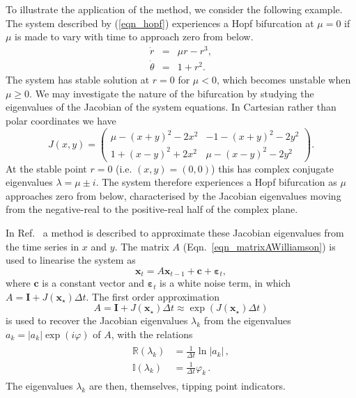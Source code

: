 \documentclass[%
aip,
amsmath,amssymb,
reprint,%
]{revtex4-1}
\newcommand{\noteRed}[1]{{#1}}
\begin{document}
To illustrate the application of the method, we consider the following example. The system described by (\ref{eqn_hopf}) experiences a Hopf bifurcation at $\mu=0$ if $\mu$ is made to vary with time to approach zero from below. 
\begin{equation}
\begin{array}{rcl}
\dot{r} &=& \mu r - r^3,\\
\dot{\theta} &=& 1 + r^2.
\end{array}
\label{eqn_hopf}
\end{equation} 
The system has stable solution at $r=0$ for $\mu<0$, which becomes unstable when $\mu\geq 0$. We may investigate the nature of the bifurcation by studying the eigenvalues of the Jacobian of the system equations. In Cartesian rather than polar coordinates we have
\begin{equation}
J(x,y) = 
\left(
\begin{array}{cc}
\mu - (x+y)^2-2x^2 & -1-(x+y)^2-2y^2\\
1+(x-y)^2 + 2x^2 & \mu - (x-y)^2-2y^2
\end{array} \right).
\label{eqn_Jacobian_homclinic}
\end{equation} 
At the stable point $r=0$ (i.e. $(x,y)=(0,0)$) this has complex conjugate eigenvalues $\lambda = \mu\pm i$. The system therefore experiences a Hopf bifurcation as $\mu$ approaches zero from below, characterised by the Jacobian eigenvalues moving from the negative-real to the positive-real half of the complex plane.

In Ref.~ a method is described to approximate these Jacobian eigenvalues from the time series in $x$ and $y$. {\noteRed The matrix $A$ (Eqn.~\ref{eqn_matrixAWilliamson}) is used to linearise the system as 
\begin{equation}
\mathbf{x}_t = A\mathbf{x}_{t-1} + \mathbf{c} + \mathbf{\varepsilon}_t,
\label{eqn_AR1analogue}
\end{equation}
where $\mathbf{c}$ is a constant vector and $\mathbf{\varepsilon}_t$ is a white noise term, in which $A = \mathbf{I}+J(\mathbf{x}_\star)\Delta t$. The first order approximation 
\begin{equation}
A = \mathbf{I}+J(\mathbf{x}_\star)\Delta t \approx \exp(J(\mathbf{x}_\star)\Delta t)
\label{eqn_jacobian_justification}
\end{equation}
is used to recover the Jacobian eigenvalues $\lambda_k$ from the eigenvalues $a_k = |a_k|\exp(i\varphi)$ of $A$, with the relations 
\begin{align}
	\begin{split}
		\mathbb{R}(\lambda_k) &= \frac{1}{\Delta t}\ln|a_k| \, ,\\
		\mathbb{I}(\lambda_k) &= \frac{1}{\Delta t} \varphi_k \, .
	\end{split}
	\label{eqn:2D:williamson-eigenvalueRelations}
\end{align}
The eigenvalues $\lambda_k$ are then, themselves,  tipping point indicators.}
\end{document}
